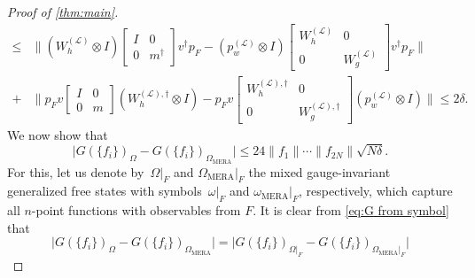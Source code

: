 \documentclass[aps,pra,reprint,superscriptaddress,floatfix,amsmath,amssymb,amsfonts]{revtex4-1}
\newcommand*{\ot}{\otimes}
\begin{document}
\begin{proof}[Proof of \cref{thm:main}]
\begin{equation}
\begin{aligned}
\leq &\bigl\lVert \left( W_h^{(\mathcal L)} \ot I \right) \begin{bmatrix}I & 0\\0 & m^\dagger\end{bmatrix} v^\dagger p_F - \left( p_w^{(\mathcal L)} \ot I \right) \begin{bmatrix}W_h^{(\mathcal L)} & 0\\0 & W_g^{(\mathcal L)}\end{bmatrix} v^\dagger p_F \bigr\rVert \\
+ &\bigl\lVert p_F v \begin{bmatrix}I & 0\\0 & m\end{bmatrix} \left( W_h^{(\mathcal L),\dagger} \ot I \right) - p_F v \begin{bmatrix}W_h^{(\mathcal L),\dagger} & 0\\0 & W_g^{(\mathcal L),\dagger}\end{bmatrix} \left( p_w^{(\mathcal L)} \ot I \right) \bigr\rVert \leq 2 \delta.
\end{aligned}
\end{equation}
We now show that
\begin{equation}\label{eq:many-body bound}
  \lvert G(\{f_i\})_\Omega - G(\{f_i\})_{\Omega_{\text{MERA}}}\rvert \leq 24 \lVert f_1 \rVert \cdots \lVert f_{2N} \rVert \sqrt{N \delta}.
\end{equation}
For this, let us denote by~$\Omega|_F$ and $\Omega_{\text{MERA}}|_F$ the mixed gauge-invariant generalized free states with symbols~$\omega|_F$ and $\omega_{\text{MERA}}|_F$, respectively, which capture all $n$-point functions with observables from $F$.
It is clear from \cref{eq:G from symbol} that
\[ \lvert G(\{f_i\})_\Omega - G(\{f_i\})_{\Omega_{\text{MERA}}}\rvert
= \lvert G(\{f_i\})_{\Omega|_F} - G(\{f_i\})_{\Omega_{\text{MERA}}|_F}\rvert
\]
\end{proof}
\end{document}
